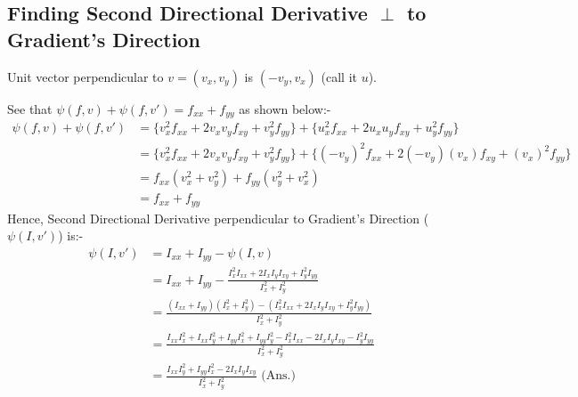 \documentclass[12pt]{article}
\begin{document}
\subsection*{Finding Second Directional Derivative $\perp$ to Gradient's Direction}
Unit vector perpendicular to $v = (v_x, v_y)$ is $(-v_y, v_x)$ (call it $u$).

See that $\psi (f, v) + \psi (f, v') = f_{xx} + f_{yy}$ as shown below:-
\begin{align*}
    \psi (f, v) + \psi (f, v') &= \{v_x^2 f_{xx} + 2 v_x v_y f_{xy} + v_y^2 f_{yy}\} + \{u_x^{2} f_{xx} + 2 u_x u_y f_{xy} + u_y^2 f_{yy}\} \\
    &= \{v_x^2 f_{xx} + 2 v_x v_y f_{xy} + v_y^2 f_{yy}\} + \{(-v_y)^{2} f_{xx} + 2 (-v_y) (v_x) f_{xy} + (v_x)^2 f_{yy}\} \\
    &= f_{xx} (v_x^2 + v_y^2) + f_{yy} (v_y^2 + v_x^2) \\
    &= f_{xx} + f_{yy}
\end{align*}
Hence, Second Directional Derivative perpendicular to Gradient's Direction ($\psi (I, v')$) is:-
\begin{align*}
    \psi (I, v') &= I_{xx} + I_{yy} - \psi (I, v) \\
    &= I_{xx} + I_{yy} - \frac{I_x^2 I_{xx} + 2 I_x I_y I_{xy} + I_y^2 I_{yy}}{I_x^2 + I_y^2} \\
    &= \frac{(I_{xx} + I_{yy})(I_x^2 + I_y^2) - (I_x^2 I_{xx} + 2 I_x I_y I_{xy} + I_y^2 I_{yy})}{I_x^2 + I_y^2} \\
    &= \frac{I_{xx} I_x^2 + I_{xx} I_y^2 + I_{yy} I_x^2 + I_{yy} I_y^2 - I_x^2 I_{xx} - 2 I_x I_y I_{xy} - I_y^2 I_{yy}}{I_x^2 + I_y^2} \\
    &= \frac{I_{xx} I_y^2 + I_{yy} I_x^2 - 2 I_x I_y I_{xy}}{I_x^2 + I_y^2} \text{ (Ans.)}
\end{align*}
\end{document}
